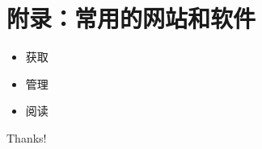 \documentclass{beamer}
\begin{document}
\section{附录：常用的网站和软件}

\begin{frame}
\begin{itemize}
	\item 获取
	\item 管理
	\item 阅读

\end{itemize}
\end{frame}





\begin{frame}
\begin{center}
	{\Huge\calligra Thanks!}
\end{center}
\end{frame}
\end{document}
